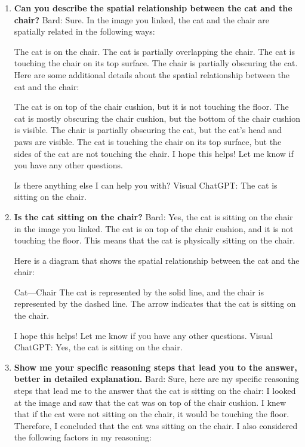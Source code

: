     \begin{enumerate}
        \item \textbf{Can you describe the spatial relationship between the cat and the chair?}
        \subitem Bard: Sure. In the image you linked, the cat and the chair are spatially related in the following ways:

        The cat is on the chair.
        The cat is partially overlapping the chair.
        The cat is touching the chair on its top surface.
        The chair is partially obscuring the cat.
        Here are some additional details about the spatial relationship between the cat and the chair:
        
        The cat is on top of the chair cushion, but it is not touching the floor.
        The cat is mostly obscuring the chair cushion, but the bottom of the chair cushion is visible.
        The chair is partially obscuring the cat, but the cat's head and paws are visible.
        The cat is touching the chair on its top surface, but the sides of the cat are not touching the chair.
        I hope this helps! Let me know if you have any other questions.
        
        Is there anything else I can help you with?
        \subitem Visual ChatGPT: The cat is sitting on the chair.
        \item \textbf{Is the cat sitting on the chair?}
        \subitem Bard:     
        Yes, the cat is sitting on the chair in the image you linked. The cat is on top of the chair cushion, and it is not touching the floor. This means that the cat is physically sitting on the chair.

        Here is a diagram that shows the spatial relationship between the cat and the chair:

        Cat---Chair
        The cat is represented by the solid line, and the chair is represented by the dashed line. The arrow indicates that the cat is sitting on the chair.

        I hope this helps! Let me know if you have any other questions.
        \subitem Visual ChatGPT: Yes, the cat is sitting on the chair.
        \item \textbf{Show me your specific reasoning steps that lead you to the answer, better in detailed explanation.}
        \subitem Bard: 
        Sure, here are my specific reasoning steps that lead me to the answer that the cat is sitting on the chair:
        I looked at the image and saw that the cat was on top of the chair cushion.
        I knew that if the cat were not sitting on the chair, it would be touching the floor.
        Therefore, I concluded that the cat was sitting on the chair.
        I also considered the following factors in my reasoning:


\end{enumerate}
